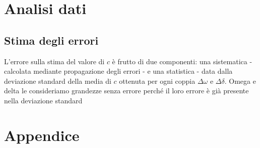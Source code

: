 \documentclass[]{article}
\let\oldsection\section%
\renewcommand{\section}{%
	\renewcommand{\theequation}{\thesection.\arabic{equation}}%
	\oldsection}%
\let\oldsubsection\subsection%
\renewcommand{\subsection}{%
	\renewcommand{\theequation}{\thesubsection.\arabic{equation}}%
	\oldsubsection}%
\begin{document}
    \section {Analisi dati}

    \subsection {Stima degli errori}


    L'errore sulla stima del valore di $ c $ è frutto di due componenti: una sistematica 
    - calcolata mediante propagazione degli errori - e una statistica - data dalla deviazione standard 
    della media di $ c $ ottenuta per ogni coppia $ \Delta \omega $ e $ \Delta \delta $. Omega e delta le consideriamo grandezze senza errore perché il loro errore è già presente nella deviazione standard


    \section{Appendice}
\end{document}
